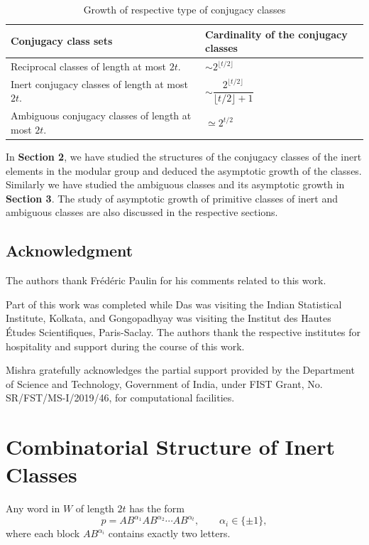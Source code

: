 \documentclass[a4paper,12pt]{amsart}
\numberwithin{equation}{section}
\theoremstyle{definition}
\numberwithin{equation}{section}
\begin{document}
\begin{table}[h]

\begin{tabular}{|m{7cm}|m{7cm}|}
\hline
\textbf{Conjugacy class sets} & \textbf{Cardinality of the conjugacy classes} \\
\hline
Reciprocal classes of length at most $2t$. 
& $\sim 2^{\lfloor t/2 \rfloor}$ \\
\hline
Inert conjugacy classes of length at most $2t$. 
& $\sim \dfrac{2^{\lfloor t/2 \rfloor}}{\lfloor t/2 \rfloor + 1}$ \\
\hline
Ambiguous conjugacy classes of length at most $2t$. 
& $\simeq 2^{t/2}$ \\
\hline
\end{tabular}
\caption{Growth of respective type of conjugacy classes}
\end{table}

In \textbf{Section 2}, we have studied the structures of the conjugacy classes of the inert elements in the modular group and deduced the asymptotic growth of the classes. Similarly we have studied the ambiguous classes and its asymptotic growth in  \textbf{Section 3}. The study of asymptotic growth of primitive classes of inert and ambiguous classes are also discussed in the respective sections.
\subsection*{Acknowledgment}
The authors thank Fr\'ed\'eric Paulin for his comments related to this work.

Part of this work was completed while Das was visiting the Indian Statistical Institute, Kolkata, and Gongopadhyay was visiting the Institut des Hautes \'Etudes Scientifiques, Paris-Saclay. The authors thank the respective institutes for hospitality and support during the course of this work.

Mishra gratefully acknowledges the partial support provided by the Department of Science and Technology, Government of India, under FIST Grant,  No. SR/FST/MS-I/2019/46,  for computational facilities.



\section{Combinatorial Structure of Inert Classes}  Any word in $W$ of length \(2t\) has the form
\[
p = AB^{\alpha_1} AB^{\alpha_2} \cdots AB^{\alpha_{t}},
\qquad \alpha_i\in\{\pm1\},
\]
where each block \(AB^{\alpha_i}\) contains exactly two letters.
\end{document}
